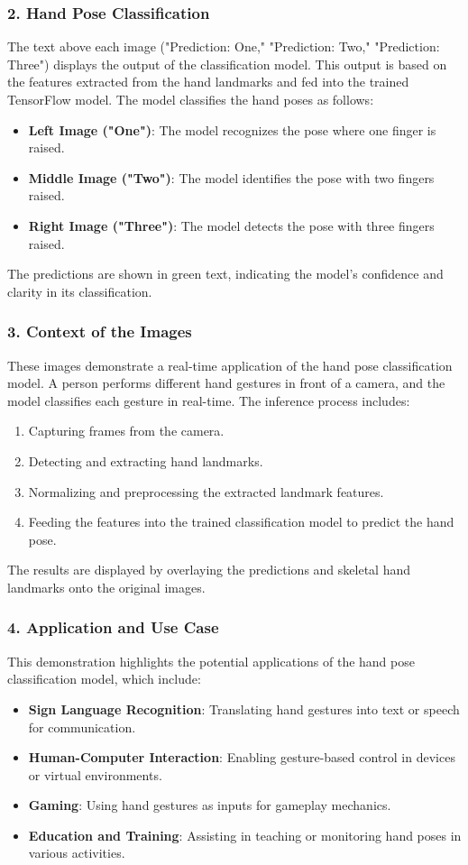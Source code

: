 \subsubsection*{2. Hand Pose Classification}
The text above each image ("Prediction: One," "Prediction: Two," "Prediction: Three") displays the output of the classification model. This output is based on the features extracted from the hand landmarks and fed into the trained TensorFlow model. The model classifies the hand poses as follows:
\begin{itemize}
	\item \textbf{Left Image ("One")}: The model recognizes the pose where one finger is raised.
	\item \textbf{Middle Image ("Two")}: The model identifies the pose with two fingers raised.
	\item \textbf{Right Image ("Three")}: The model detects the pose with three fingers raised.
\end{itemize}
The predictions are shown in green text, indicating the model's confidence and clarity in its classification.

\subsubsection*{3. Context of the Images}
These images demonstrate a real-time application of the hand pose classification model. A person performs different hand gestures in front of a camera, and the model classifies each gesture in real-time. The inference process includes:
\begin{enumerate}
	\item Capturing frames from the camera.
	\item Detecting and extracting hand landmarks.
	\item Normalizing and preprocessing the extracted landmark features.
	\item Feeding the features into the trained classification model to predict the hand pose.
\end{enumerate}
The results are displayed by overlaying the predictions and skeletal hand landmarks onto the original images.

\subsubsection*{4. Application and Use Case}
This demonstration highlights the potential applications of the hand pose classification model, which include:
\begin{itemize}
	\item \textbf{Sign Language Recognition}: Translating hand gestures into text or speech for communication.
	\item \textbf{Human-Computer Interaction}: Enabling gesture-based control in devices or virtual environments.
	\item \textbf{Gaming}: Using hand gestures as inputs for gameplay mechanics.
	\item \textbf{Education and Training}: Assisting in teaching or monitoring hand poses in various activities.
\end{itemize}

